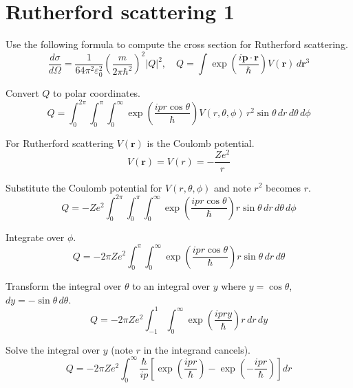 


\section*{Rutherford scattering 1}

Use the following formula to compute the cross section for Rutherford scattering.
\begin{equation*}
\frac{d\sigma}{d\Omega}=\frac{1}{64\pi^2\varepsilon_0^2}\left(\frac{m}{2\pi\hbar^2}\right)^2|Q|^2,\quad
Q=\int\exp\left(\frac{i\mathbf p\cdot\mathbf r}{\hbar}\right)V(\mathbf r)\,d\mathbf r^3
\end{equation*}

Convert $Q$ to polar coordinates.
\begin{equation*}
Q=\int_0^{2\pi}
\int_0^\pi
\int_0^\infty
\exp\left(\frac{ipr\cos\theta}{\hbar}\right)V(r,\theta,\phi)
\,r^2\sin\theta\,dr\,d\theta\,d\phi
\end{equation*}

For Rutherford scattering $V(\mathbf r)$ is the Coulomb potential.
\begin{equation*}
V(\mathbf r)=V(r)=-\frac{Ze^2}{r}
\end{equation*}

Substitute the Coulomb potential for $V(r,\theta,\phi)$ and note $r^2$ becomes $r$.
\begin{equation*}
Q=-Ze^2
\int_0^{2\pi}
\int_0^\pi
\int_0^\infty
\exp\left(\frac{ipr\cos\theta}{\hbar}\right)
r\sin\theta\,dr\,d\theta\,d\phi
\end{equation*}

Integrate over $\phi$.
\begin{equation*}
Q=-2\pi Ze^2
\int_0^\pi
\int_0^\infty
\exp\left(\frac{ipr\cos\theta}{\hbar}\right)
r\sin\theta\,dr\,d\theta
\end{equation*}

Transform the integral over $\theta$ to an integral over $y$
where $y=\cos\theta$, $dy=-\sin\theta\,d\theta$.
\begin{equation*}
Q=-2\pi Ze^2
\int_{-1}^1
\int_0^\infty
\exp\left(\frac{ipry}{\hbar}\right)
r\,dr\,dy
\end{equation*}

Solve the integral over $y$ (note $r$ in the integrand cancels).
\begin{equation*}
Q=-2\pi Ze^2
\int_0^\infty
\frac{\hbar}{ip}
\left[\exp\left(\frac{ipr}{\hbar}\right)-\exp\left(-\frac{ipr}{\hbar}\right)\right]
dr
\end{equation*}

